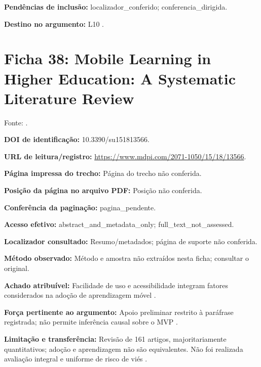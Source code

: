 \noindent\textbf{Pendências de inclusão:} localizador\_conferido; conferencia\_dirigida.\par\medskip

\noindent\textbf{Destino no argumento:} L10 .

\clearpage\section*{Ficha 38: Mobile Learning in Higher Education: A Systematic Literature Review}

Fonte: \citet{naveed2023}.

\noindent\textbf{DOI de identificação:} 10.3390/su151813566.\par\medskip

\noindent\textbf{URL de leitura/registro:} \url{https://www.mdpi.com/2071-1050/15/18/13566}.\par\medskip

\noindent\textbf{Página impressa do trecho:} Página do trecho não conferida.\par\medskip

\noindent\textbf{Posição da página no arquivo PDF:} Posição não conferida.\par\medskip

\noindent\textbf{Conferência da paginação:} pagina\_pendente.\par\medskip

\noindent\textbf{Acesso efetivo:} abstract\_and\_metadata\_only; full\_text\_not\_assessed.\par\medskip

\noindent\textbf{Localizador consultado:} Resumo/metadados; página de suporte não conferida.\par\medskip

\noindent\textbf{Método observado:} Método e amostra não extraídos nesta ficha; consultar o original.\par\medskip

\noindent\textbf{Achado atribuível:} Facilidade de uso e acessibilidade integram fatores considerados na adoção de aprendizagem móvel \citep{naveed2023}.\par\medskip

\noindent\textbf{Força pertinente ao argumento:} Apoio preliminar restrito à paráfrase registrada; não permite inferência causal sobre o MVP \citep{naveed2023}.\par\medskip

\noindent\textbf{Limitação e transferência:} Revisão de 161 artigos, majoritariamente quantitativos; adoção e aprendizagem não são equivalentes. Não foi realizada avaliação integral e uniforme de risco de viés \citep{naveed2023}.\par\medskip

